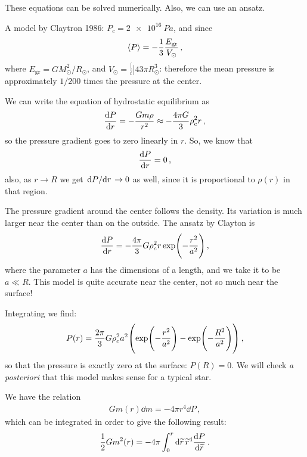 \documentclass[main.tex]{subfiles}
\begin{document}
These equations can be solved numerically. Also, we can use an ansatz. 

A model by Claytron 1986: \(P_c = \SI{2e16}{Pa}\), and since 
%
\begin{align}
  \expval{P} = - \frac{1}{3} \frac{E _{\text{gr}}}{V_{\odot}}
\,,
\end{align}
%
where \(E _{\text{gr}} = G M_{\odot}^2 / R_{\odot}\), and \(V_{\odot} = \frac[i]{4}{3} \pi R_{\odot}^3\): therefore the mean pressure is approximately \(1/200\) times the pressure at the center. 

We can write the equation of hydrostatic equilibrium as 
%
\begin{align}
  \dv{P}{r} = - \frac{Gm \rho }{r^2} \approx -\frac{4 \pi G}{3} \rho^2_c r 
\,,
\end{align}
%
so the pressure gradient goes to zero linearly in \(r\). 
So, we know that 
%
\begin{align}
  \dv{P}{r} (r=0) = 0
\,,
\end{align}
%
also, as \(r \rightarrow R\) we get \(\dv*{P}{r} \rightarrow 0\) as well, since it is proportional to \(\rho (r)\) in that region. 

The pressure gradient around the center follows the density. Its variation is much larger near the center than on the outside. 
The ansatz by Clayton is 
%
\begin{align}
  \dv{P}{r} = -\frac{4 \pi }{3} G \rho _c^2 r \exp(- \frac{r^2}{a^2})
\,,
\end{align}
%
where the parameter \(a\) has the dimensions of a length, and we take it to be \(a \ll R \). This model is quite accurate near the center, not so much near the surface! 

Integrating we find: 
%
\begin{align}
  P(r) = \frac{2 \pi }{3} G \rho_c^2 a^2 \qty(\exp(- \frac{r^2}{a^2}) - \exp(- \frac{R^2}{a^2}))
\,,
\end{align}
%
so that the pressure is exactly zero at the surface: \(P(R) = 0\).
We will check \emph{a posteriori} that this model makes sense for a typical star.

We have the relation 
%
\begin{align}
  G m(r) \dd{m} = - 4 \pi r^{4} \dd{P}
\,,
\end{align}
%
which can be integrated in order to give the following result: 
%
\begin{align}
  \frac{1}{2} G m^2(r) = - 4 \pi \int_{0}^{r} \dd{\widetilde{r}} \widetilde{r}^{4} \dv{P}{\widetilde{r}}
\,.
\end{align}
\end{document}
